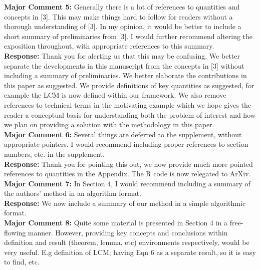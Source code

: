 \documentclass[12pt]{article}
\begin{document}
{\bf Major Comment 5:} Generally there is a lot of references to quantities and concepts in [3]. This may make things hard to follow for readers without a thorough understanding of [3]. In my opinion, it would be better to include a short summary of preliminaries from [3]. I would further recommend altering the exposition throughout, with appropriate references to this summary. \\

{\bf Response:} Thank you for alerting us that this may be confusing.  We better separate the developments in this manuscript from the concepts in [3] without including a summary of preliminaries. We better elaborate the contributions in this paper as suggested. We provide definitions of key quantities as suggested, for example the LCM is now defined within our framework. We also remove references to technical terms in the motivating example which we hope gives the reader a conceptual basis for understanding both the problem of interest and how we plan on providing a solution with the methodology in this paper. \\



{\bf Major Comment 6:} Several things are deferred to the supplement, without appropriate pointers. I would recommend including proper references to section numbers, etc. in the supplement. \\

{\bf Response:} Thank you for pointing this out, we now provide much more pointed references to quantities in the Appendix. The R code is now relegated to ArXiv. \\



{\bf Major Comment 7:} In Section 4, I would recommend including a summary of the authors’ method in an algorithm format. \\

{\bf Response:} We now include a summary of our method in a simple algorithmic format. \\



{\bf Major Comment 8:} Quite some material is presented in Section 4 in a free-flowing manner. However, providing key concepts and conclusions within definition and result (theorem, lemma, etc) environments respectively, would be very useful. E.g definition of LCM; having Eqn 6 as a separate result, so it is easy to find, etc. \\
\end{document}
